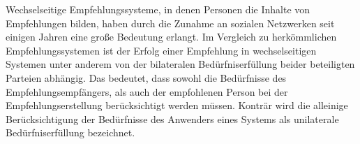 Wechselseitige Empfehlungssysteme, in denen Personen die Inhalte von Empfehlungen bilden, haben durch die Zunahme an sozialen Netzwerken seit einigen Jahren eine große Bedeutung erlangt.
Im Vergleich zu herkömmlichen Empfehlungssystemen ist der Erfolg einer Empfehlung in wechselseitigen Systemen unter anderem von der bilateralen Bedürfniserfüllung beider beteiligten Parteien abhängig.
Das bedeutet, dass sowohl die Bedürfnisse des Empfehlungsempfängers, als auch der empfohlenen Person bei der Empfehlungserstellung berücksichtigt werden müssen.
Konträr wird die alleinige Berücksichtigung der Bedürfnisse des Anwenders eines Systems als unilaterale Bedürfniserfüllung bezeichnet.

